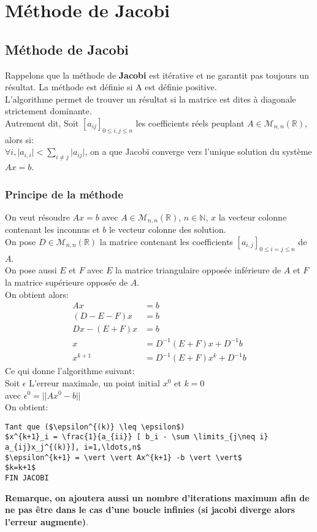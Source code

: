 \chapter{Méthode de Jacobi}
\section{Méthode de Jacobi}
Rappelons que la méthode de \textbf{Jacobi} est itérative et ne garantit pas toujours un résultat. La méthode est définie si A est définie positive.\\
L'algorithme permet de trouver un résultat si la matrice est dites à diagonale strictement dominante. \\
Autrement dit, Soit $[a_{ij}]_{0 \leq i,j \leq n}$ les coefficients réels peuplant $A \in \mathcal{M}_{n,n} (\mathbb{R})$, alors si:\\
$\forall i, \vert a_{i,i} \vert <  \sum \limits_{i \neq j} \vert a_{ij} \vert$, on a que Jacobi converge vers l'unique solution du système $Ax=b$. 
\subsection{Principe de la méthode}
On veut résoudre $Ax=b$ avec $A \in \mathcal{M}_{n,n} (\mathbb{R})$, $n \in \mathbb{N}$, $x$ la vecteur colonne contenant les inconnus et $b$ le vecteur colonne des solution. \\
On pose $D \in \mathcal{M}_{n,n}(\mathbb{R})$ la matrice contenant les coefficients $[a_{i,j}]_{0 \leq i=j \leq n}$ de $A$. \\
On pose aussi $E$ et $F$ avec $E$ la matrice triangulaire opposée inférieure de $A$ et $F$ la matrice supérieure opposée de $A$.  \\
On obtient alors:
\begin{align}
Ax &=b \\
(D-E-F)x &= b \\
Dx -(E+F)x &= b \\
x &=D^{-1}(E+F)x+D^{-1}b \\
x^{k+1} &=D^{-1}(E+F)x^{k}+D^{-1}b 
\end{align}
Ce qui donne l'algorithme suivant: \\
Soit $\epsilon$ L'erreur maximale, un point initial $x^0$ et $k=0$ \\
avec $\epsilon^{0} = \vert \vert A x^0 -b \vert \vert$ \\
On obtient: 
\begin{lstlisting}[mathescape=true, frame=single]
Tant que ($\epsilon^{(k)} \leq \epsilon$)
$x^{k+1}_i = \frac{1}{a_{ii}} [ b_i - \sum \limits_{j\neq i} a_{ij}x_j^{(k)}], i=1,\ldots,n$
$\epsilon^{k+1} = \vert \vert Ax^{k+1} -b \vert \vert$
$k=k+1$
FIN JACOBI
\end{lstlisting}
\textbf{Remarque, on ajoutera aussi un nombre d'iterations maximum afin de ne pas être dans le cas d'une boucle infinies (si jacobi diverge alors l'erreur augmente)}.

